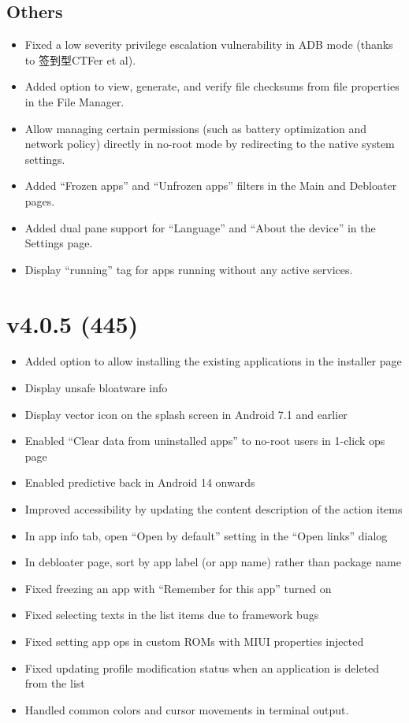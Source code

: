 \subsection{Others}
\begin{itemize}
    \item Fixed a low severity privilege escalation vulnerability in ADB mode (thanks to 签到型CTFer et al).
    \item Added option to view, generate, and verify file checksums from file properties in the File Manager.
    \item Allow managing certain permissions (such as battery optimization and network policy) directly in no-root mode by redirecting to the native system settings.
    \item Added ``Frozen apps'' and ``Unfrozen apps'' filters in the Main and Debloater pages.
    \item Added dual pane support for ``Language'' and ``About the device'' in the Settings page.
    \item Display ``running'' tag for apps running without any active services.
\end{itemize}

\section{v4.0.5 (445)}\label{sec:v4.0.5-(445)}
\begin{itemize}
    \item Added option to allow installing the existing applications in the installer page
    \item Display unsafe bloatware info
    \item Display vector icon on the splash screen in Android 7.1 and earlier
    \item Enabled ``Clear data from uninstalled apps'' to no-root users in 1-click ops page
    \item Enabled predictive back in Android 14 onwards
    \item Improved accessibility by updating the content description of the action items
    \item In app info tab, open ``Open by default'' setting in the ``Open links'' dialog
    \item In debloater page, sort by app label (or app name) rather than package name
    \item Fixed freezing an app with ``Remember for this app'' turned on
    \item Fixed selecting texts in the list items due to framework bugs
    \item Fixed setting app ops in custom ROMs with MIUI properties injected
    \item Fixed updating profile modification status when an application is deleted from the list
    \item Handled common colors and cursor movements in terminal output.
\end{itemize}

